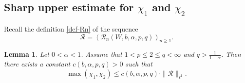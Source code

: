 \documentclass[12pt]{amsart}
\newtheorem{lemma}[theorem]{Lemma}
\theoremstyle{definition}
\theoremstyle{remark}
\newtheorem*{remark*}{Remark}
\numberwithin{equation}{section}
\begin{document}

\subsection{Sharp upper estimate for $\chi_1$ and $\chi_2$}






Recall the definition \eqref{def-Rn} of the sequence  
\[
\mathcal{R} = (\mathcal{R}_n  (W, b, \alpha, p, q))_{n\ge 1}.
\]
\begin{lemma}\label{lem-chi-I}
Let $0<\alpha<1$.  Assume that $1< p\le 2 \le q <\infty$ and $q> \frac{1}{1 - \alpha}$.  Then there exists a constant $c(b, \alpha, p, q)>0$ such that 
\[
\max(\chi_1, \chi_2)   \le   c(b, \alpha, p, q)  \cdot \| \mathcal{R}\|_{\ell^1}.
\]
\end{lemma}
\end{document}
